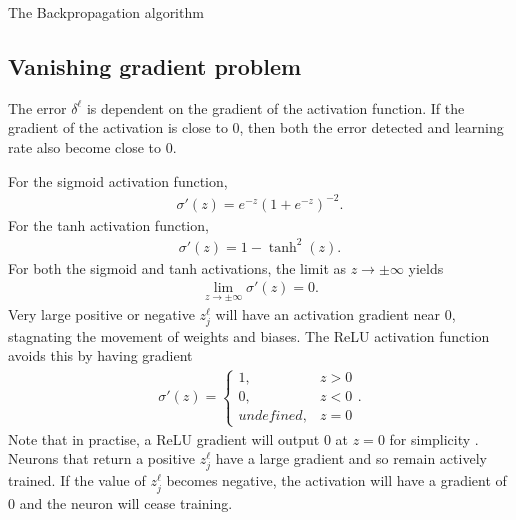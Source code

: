 \begin{algorithm}[H]
\label{nnets-bprop-alg}
\SetAlgoLined
{}
\caption{The Backpropagation algorithm}
\end{algorithm}




\subsection*{Vanishing gradient problem}\label{nnet-vanishinggradprob}
The error $\delta^\ell$ is dependent on the gradient of the activation function. If the gradient of the activation is close to 0, then both the error detected and learning rate also become close to 0.

\noindent For the sigmoid activation function,
\begin{align}
	\sigma '(z) = e^{-z}(1+e^{-z})^{-2}.
\end{align}
For the tanh activation function,
\begin{align}
	\sigma '(z) = 1-\tanh^2(z).
\end{align}
For both the sigmoid and tanh activations, the limit as $z\rightarrow\pm\infty$ yields 
\begin{align}
	\lim_{z\rightarrow\pm\infty}\sigma '(z)= 0.
\end{align}
Very large positive or negative $z_j^\ell$ will have an activation gradient near 0, stagnating the movement of weights and biases. The ReLU activation function avoids this by having gradient
\begin{align}
	\sigma '(z) = \begin{cases}
		1, & z > 0 \\
		0, & z < 0 \\
		undefined, & z = 0
	\end{cases}.
\end{align}
Note that in practise, a ReLU gradient will output 0 at $z = 0$ for simplicity \cite{Goodfellow-et-al-2016}. Neurons that return a positive $z_j^\ell$ have a large gradient and so remain actively trained. If the value of $z_j^\ell$ becomes negative, the activation will have a gradient of 0 and the neuron will cease training. 


